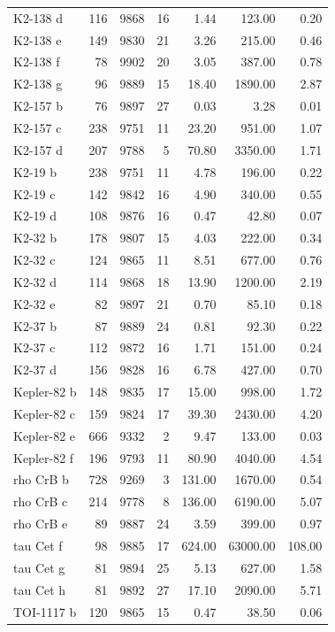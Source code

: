 \begin{table}
\begin{tabular}{lrrrrrr}
K2-138 d & 116 & 9868 & 16 & 1.44 & 123.00 & 0.20 \\
K2-138 e & 149 & 9830 & 21 & 3.26 & 215.00 & 0.46 \\
K2-138 f & 78 & 9902 & 20 & 3.05 & 387.00 & 0.78 \\
K2-138 g & 96 & 9889 & 15 & 18.40 & 1890.00 & 2.87 \\
K2-157 b & 76 & 9897 & 27 & 0.03 & 3.28 & 0.01 \\
K2-157 c & 238 & 9751 & 11 & 23.20 & 951.00 & 1.07 \\
K2-157 d & 207 & 9788 & 5 & 70.80 & 3350.00 & 1.71 \\
K2-19 b & 238 & 9751 & 11 & 4.78 & 196.00 & 0.22 \\
K2-19 c & 142 & 9842 & 16 & 4.90 & 340.00 & 0.55 \\
K2-19 d & 108 & 9876 & 16 & 0.47 & 42.80 & 0.07 \\
K2-32 b & 178 & 9807 & 15 & 4.03 & 222.00 & 0.34 \\
K2-32 c & 124 & 9865 & 11 & 8.51 & 677.00 & 0.76 \\
K2-32 d & 114 & 9868 & 18 & 13.90 & 1200.00 & 2.19 \\
K2-32 e & 82 & 9897 & 21 & 0.70 & 85.10 & 0.18 \\
K2-37 b & 87 & 9889 & 24 & 0.81 & 92.30 & 0.22 \\
K2-37 c & 112 & 9872 & 16 & 1.71 & 151.00 & 0.24 \\
K2-37 d & 156 & 9828 & 16 & 6.78 & 427.00 & 0.70 \\
Kepler-82 b & 148 & 9835 & 17 & 15.00 & 998.00 & 1.72 \\
Kepler-82 c & 159 & 9824 & 17 & 39.30 & 2430.00 & 4.20 \\
Kepler-82 e & 666 & 9332 & 2 & 9.47 & 133.00 & 0.03 \\
Kepler-82 f & 196 & 9793 & 11 & 80.90 & 4040.00 & 4.54 \\
rho CrB b & 728 & 9269 & 3 & 131.00 & 1670.00 & 0.54 \\
rho CrB c & 214 & 9778 & 8 & 136.00 & 6190.00 & 5.07 \\
rho CrB e & 89 & 9887 & 24 & 3.59 & 399.00 & 0.97 \\
tau Cet f & 98 & 9885 & 17 & 624.00 & 63000.00 & 108.00 \\
tau Cet g & 81 & 9894 & 25 & 5.13 & 627.00 & 1.58 \\
tau Cet h & 81 & 9892 & 27 & 17.10 & 2090.00 & 5.71 \\
TOI-1117 b & 120 & 9865 & 15 & 0.47 & 38.50 & 0.06 \\

\end{tabular}
\end{table}
